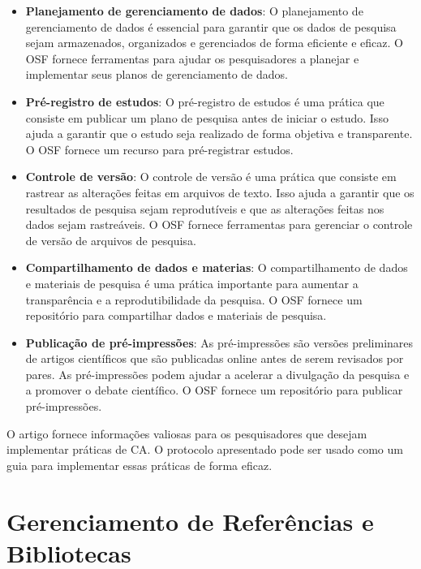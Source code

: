 \documentclass[
  a4paper,
]{book}
\begin{document}
\begin{tcolorbox}
\begin{itemize}
\item
  \textbf{Planejamento de gerenciamento de dados}: O planejamento de
  gerenciamento de dados é essencial para garantir que os dados de
  pesquisa sejam armazenados, organizados e gerenciados de forma
  eficiente e eficaz. O OSF fornece ferramentas para ajudar os
  pesquisadores a planejar e implementar seus planos de gerenciamento de
  dados.
\item
  \textbf{Pré-registro de estudos}: O pré-registro de estudos é uma
  prática que consiste em publicar um plano de pesquisa antes de iniciar
  o estudo. Isso ajuda a garantir que o estudo seja realizado de forma
  objetiva e transparente. O OSF fornece um recurso para pré-registrar
  estudos.
\item
  \textbf{Controle de versão}: O controle de versão é uma prática que
  consiste em rastrear as alterações feitas em arquivos de texto. Isso
  ajuda a garantir que os resultados de pesquisa sejam reprodutíveis e
  que as alterações feitas nos dados sejam rastreáveis. O OSF fornece
  ferramentas para gerenciar o controle de versão de arquivos de
  pesquisa.
\item
  \textbf{Compartilhamento de dados e materias}: O compartilhamento de
  dados e materiais de pesquisa é uma prática importante para aumentar a
  transparência e a reprodutibilidade da pesquisa. O OSF fornece um
  repositório para compartilhar dados e materiais de pesquisa.
\item
  \textbf{Publicação de pré-impressões}: As pré-impressões são versões
  preliminares de artigos científicos que são publicadas online antes de
  serem revisados por pares. As pré-impressões podem ajudar a acelerar a
  divulgação da pesquisa e a promover o debate científico. O OSF fornece
  um repositório para publicar pré-impressões.\vspace{0.5em}
\end{itemize}

O artigo fornece informações valiosas para os pesquisadores que desejam
implementar práticas de CA. O protocolo apresentado pode ser usado como
um guia para implementar essas práticas de forma eficaz.

\end{tcolorbox}


\chapter{Gerenciamento de Referências e Bibliotecas}\label{sec-zotero}
\end{document}
